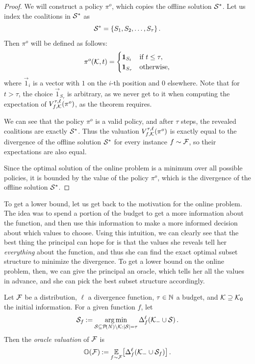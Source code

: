 \begin{proof}
  We will construct a policy $ \pi^o $, which copies the offline solution $ \mathcal{S}^* $.
  Let us index the coalitions in $ \mathcal{S}^* $ as \[
    \mathcal{S}^* = \left\{ S_1, S_2, \ldots, S_\tau \right\}.
  \]
  Then $ \pi^o $ will be defined as follows: \[
    \pi^o\!\left(\mathcal{K}, t\right) = \begin{cases}
      \boldsymbol 1_{S_t} & \text{if } t \leq \tau, \\
      \boldsymbol 1_{S_\tau} & \text{otherwise,}
    \end{cases}
  \]
  where $ \vec 1_i $ is a vector with $ 1 $ on the $ i $-th position and $ 0 $ elsewhere.
  Note that for $ t > \tau $, the choice $ \vec 1_{S_\tau} $ is arbitrary, as we never get to it when computing the expectation of $ V^{\tau,\ell}_{f,\mathcal{K}}\!\left(\pi^o\right) $, as the theorem requires.

  We can see that the policy $ \pi^o $ is a valid policy, and after $ \tau $ steps, the revealed coalitions are exactly $ \mathcal{S}^* $.
  Thus the valuation $ V^{\tau,\ell}_{f,\mathcal{K}}\!\left(\pi^o\right) $ is exactly equal to the divergence of the offline solution $ \mathcal{S}^* $ for every instance $ f \sim \mathcal{F} $, so their expectations are also equal.

  Since the optimal solution of the online problem is a minimum over all possible policies, it is bounded by the value of the policy $ \pi^o $, which is the divergence of the offline solution $ \mathcal{S}^* $.
\end{proof}

To get a lower bound, let us get back to the motivation for the online problem.
The idea was to spend a portion of the budget to get a more information about the function, and then use this information to make a more informed decision about which values to choose.
Using this intuition, we can clearly see that the best thing the principal can hope for is that the values she reveals tell her \emph{everything} about the function, and thus she can find the exact optimal subset structure to minimize the divergence.
To get a lower bound on the online problem, then, we can give the principal an oracle, which tells her all the values in advance, and she can pick the best subset structure accordingly.

\begin{defi}
  \label{def:oracle-valuation}
  Let $ \mathcal{F} $ be a distribution, $ \ell $ a divergence function, $ \tau \in \mathbb{N} $ a budget, and $ \mathcal{K} \supseteq \mathcal{K}_0 $ the initial information.
  For a given function $ f $, let \begin{equation}\label{eq:def-sf}
    \mathcal{S}_f \mathbin{:=} \operatorname*{arg\,min}_{\mathcal{S} \subseteq \mathcal{P}\!\left(N\right) \setminus \mathcal{K}: \left\lvert \mathcal{S} \right\rvert = \tau} \Delta_{f}^{\ell}\!\left(\mathcal{K}_- \cup \mathcal{S}\right).
  \end{equation}
  Then the \emph{oracle valuation} of $ \mathcal{F} $ is \[
    \mathbb O\!\left(\mathcal{F}\right) \mathbin{:=} \operatorname*{\mathbb{E}}_{f \sim \mathcal{F}}\!\left[ \Delta_{f}^{\ell}\!\left(\mathcal{K}_- \cup \mathcal{S}_f\right) \right].
  \]
\end{defi}

